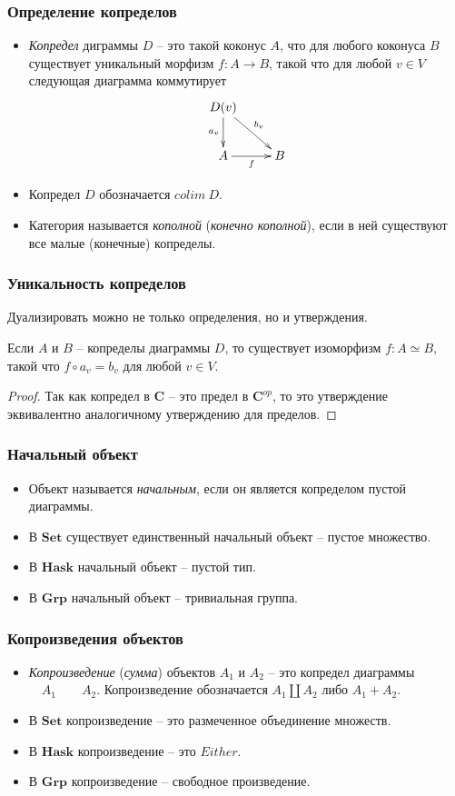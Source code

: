 \documentclass{beamer}
\theoremstyle{definition}
\newcommand{\cat}[1]{\mathbf{#1}}
\renewcommand{\C}{\cat{C}}
\newcommand{\Set}{\cat{Set}}
\newcommand{\Grp}{\cat{Grp}}
\newcommand{\Hask}{\cat{Hask}}
\begin{document}
\begin{frame}
\frametitle{Определение копределов}
\begin{itemize}
\item \emph{Копредел} диграммы $D$ -- это такой коконус $A$, что для любого коконуса $B$ существует уникальный морфизм $f : A \to B$, такой что для любой $v \in V$ следующая диаграмма коммутирует
\[ \xymatrix{ D(v) \ar[d]_{a_v} \ar[dr]^{b_v} \\
              A \ar[r]_f & B
            } \]
\item Копредел $D$ обозначается $colim\ D$.
\item Категория называется \emph{кополной} (\emph{конечно кополной}), если в ней существуют все малые (конечные) копределы.
\end{itemize}
\end{frame}

\begin{frame}
\frametitle{Уникальность копределов}
Дуализировать можно не только определения, но и утверждения.
\begin{prop}
Если $A$ и $B$ -- копределы диаграммы $D$, то существует изоморфизм $f : A \simeq B$, такой что $f \circ a_v = b_v$ для любой $v \in V$.
\end{prop}
\begin{proof}
Так как копредел в $\C$ -- это предел в $\C^{op}$, то это утверждение эквивалентно аналогичному утверждению для пределов.
\end{proof}
\end{frame}

\begin{frame}
\frametitle{Начальный объект}
\begin{itemize}
\item Объект называется \emph{начальным}, если он является копределом пустой диаграммы.
\item В $\Set$ существует единственный начальный объект -- пустое множество.
\item В $\Hask$ начальный объект -- пустой тип.
\item В $\Grp$ начальный объект -- тривиальная группа.
\end{itemize}
\end{frame}

\begin{frame}
\frametitle{Копроизведения объектов}
\begin{itemize}
\item \emph{Копроизведение} (\emph{сумма}) объектов $A_1$ и $A_2$ -- это копредел диаграммы $\quad A_1 \qquad A_2$. Копроизведение обозначается $A_1 \amalg A_2$ либо $A_1 + A_2$.
\item В $\Set$ копроизведение -- это размеченное объединение множеств.
\item В $\Hask$ копроизведение -- это $Either$.
\item В $\Grp$ копроизведение -- свободное произведение.
\end{itemize}
\end{frame}
\end{document}
